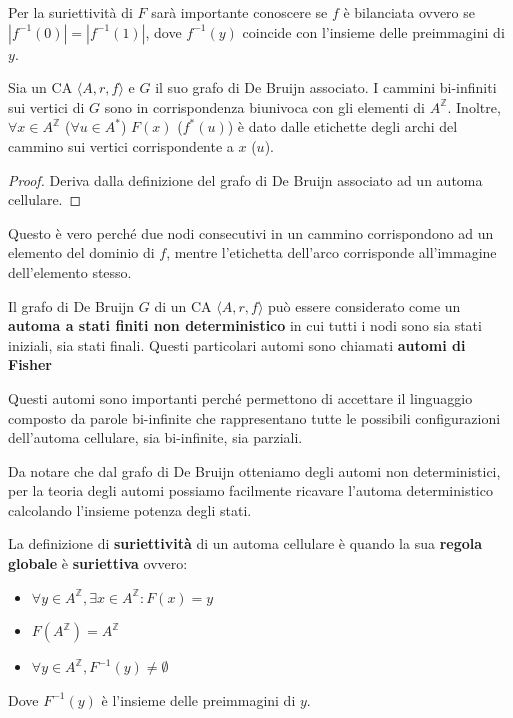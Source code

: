 \begin{nota}
    Per la suriettività di $F$ sarà importante conoscere se $f$ è bilanciata ovvero
    se $|f^{-1}(0)| =|f^{-1}(1)|$, dove $  f^{-1}(y)$ coincide con l'insieme delle 
    preimmagini di $y$.
\end{nota}

\begin{nota}
    Sia un CA $\langle A,r,f\rangle$ e $G$ il suo grafo di De Bruijn associato.
    I cammini bi-infiniti sui vertici di $G$ sono in corrispondenza biunivoca 
    con gli elementi di $A^\mathbb{Z}$. Inoltre, $\forall x\in A^\mathbb{Z}$ ($ \forall u\in A^\ast$)
    $F(x)$ ($f^\ast(u)$) è dato dalle etichette degli archi del cammino sui vertici
    corrispondente a $x$ ($u$).
    \begin{proof}
        Deriva dalla definizione del grafo di De Bruijn associato ad un automa cellulare.
    \end{proof}
\end{nota}

Questo è vero perché due nodi consecutivi in un cammino corrispondono ad un elemento
del dominio di $f$, mentre l'etichetta dell'arco corrisponde all'immagine dell'elemento 
stesso.

\begin{nota}
    Il grafo di De Bruijn $G$ di un CA $\langle A,r,f\rangle$ può essere considerato
    come un \textbf{automa a stati finiti non deterministico} in cui tutti i nodi sono sia stati iniziali, sia 
    stati finali. Questi particolari automi sono chiamati \textbf{automi di Fisher}
\end{nota}

Questi automi sono importanti perché permettono di accettare il linguaggio composto
da parole bi-infinite che rappresentano tutte le possibili configurazioni dell'automa
cellulare, sia bi-infinite, sia parziali.

Da notare che dal grafo di De Bruijn otteniamo degli automi non deterministici, 
per la teoria degli automi possiamo facilmente ricavare l'automa deterministico
calcolando l'insieme potenza degli stati.

\begin{definizione} 
    La definizione di \textbf{suriettività} di un automa cellulare è quando la sua 
    \textbf{regola globale} è \textbf{suriettiva} ovvero:
    \begin{itemize}
        \item $\forall y\in A^\mathbb{Z},\exists x\in A^\mathbb{Z}: F(x) = y$
        \item $F(A^\mathbb{Z}) = A^\mathbb{Z}$
        \item $\forall y \in A^\mathbb{Z}, F^{-1}(y) \ne \emptyset $
    \end{itemize}
    Dove $F^{-1}(y)$ è l'insieme delle preimmagini di $y$.
\end{definizione}

